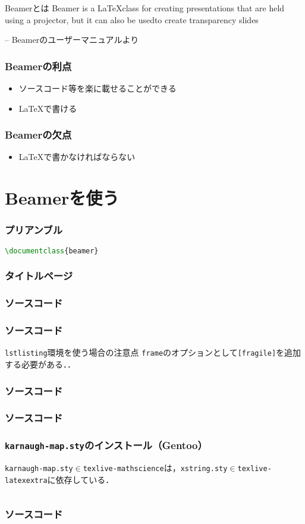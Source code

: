 \documentclass[dvipdfmx,uplatex,a4j,12pt]{beamer}
\newcommand\putsource[1]{
    \begin{frame}
        \frametitle{ソースコード}

        
    \end{frame}
}
\newcommand\generateslides[1]{
    
    \putsource{#1.tex}
}
\begin{document}
\begin{frame}{Beamerとは}
    Beamer is a \LaTeX class for creating presentations that are held using a projector, but it can also be usedto create transparency slides

    -- Beamerのユーザーマニュアルより\cite{beamer_manual}
\end{frame}

\begin{frame}
    \frametitle{Beamerの利点}

    \begin{itemize}
        \item ソースコード等を楽に載せることができる
        \item \LaTeX で書ける
    \end{itemize}
\end{frame}

\begin{frame}
    \frametitle{Beamerの欠点}

    \begin{itemize}
        \item \LaTeX で書かなければならない
    \end{itemize}
\end{frame}

\section{Beamerを使う}
\begin{frame}[fragile]
    \frametitle{プリアンブル}
    \begin{lstlisting}[language={tex}]
\documentclass{beamer}
    \end{lstlisting}
\end{frame}

\begin{frame}[fragile]
    \frametitle{タイトルページ}
    
\end{frame}

\generateslides{equation}
\generateslides{code}

\begin{frame}{\lstinline{lstlisting}環境を使う場合の注意点}
    \lstinline{frame}のオプションとして\lstinline{[fragile]}を追加する必要がある．\cite{why_fragile}．
\end{frame}

\generateslides{image}
\generateslides{karnaugh-map}

\begin{frame}[fragile]
    \frametitle{\lstinline{karnaugh-map.sty}のインストール（Gentoo）}

    \lstinline{karnaugh-map.sty}$\in$\lstinline{texlive-mathscience}は，\lstinline{xstring.sty}$\in$\lstinline{texlive-latexextra}に依存している．

    \begin{lstlisting}[language={sh}, caption=\lstinline{e-file}]
%sudo emerge -avt texlive-mathscience texlive-latexextra
    \end{lstlisting}
\end{frame}

\generateslides{bib}
\end{document}
